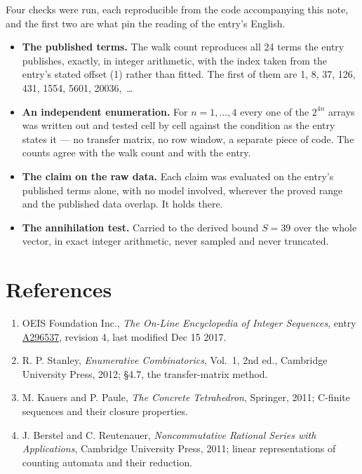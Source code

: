 \documentclass[11pt]{article}
\theoremstyle{definition}
\begin{document}
Four checks were run, each reproducible from the code accompanying this note, and the first two are what pin the reading of the entry's English.

\begin{itemize}

\item {\bfseries The published terms.} The walk count reproduces all 24 terms the entry publishes, exactly, in integer arithmetic, with the index taken from the entry's stated offset (1) rather than fitted. The first of them are 1, 8, 37, 126, 431, 1554, 5601, 20036,~\dots

\item {\bfseries An independent enumeration.} For $n = 1,\dots,4$ every one of the $2^{4n}$ arrays was written out and tested cell by cell against the condition as the entry states it --- no transfer matrix, no row window, a separate piece of code. The counts agree with the walk count and with the entry.

\item {\bfseries The claim on the raw data.} Each claim was evaluated on the entry's published terms alone, with no model involved, wherever the proved range and the published data overlap. It holds there.

\item {\bfseries The annihilation test.} Carried to the derived bound $S = 39$ over the whole vector, in exact integer arithmetic, never sampled and never truncated.

\end{itemize}

\section{References}

\begin{enumerate}

\item OEIS Foundation Inc., \emph{The On-Line Encyclopedia of Integer Sequences}, entry \href{https://oeis.org/A296537}{A296537}, revision 4, last modified Dec 15 2017.

\item R. P. Stanley, \emph{Enumerative Combinatorics}, Vol.~1, 2nd ed., Cambridge University Press, 2012; \S4.7, the transfer-matrix method.

\item M. Kauers and P. Paule, \emph{The Concrete Tetrahedron}, Springer, 2011; C-finite sequences and their closure properties.

\item J. Berstel and C. Reutenauer, \emph{Noncommutative Rational Series with Applications}, Cambridge University Press, 2011; linear representations of counting automata and their reduction.

\end{enumerate}
\end{document}
